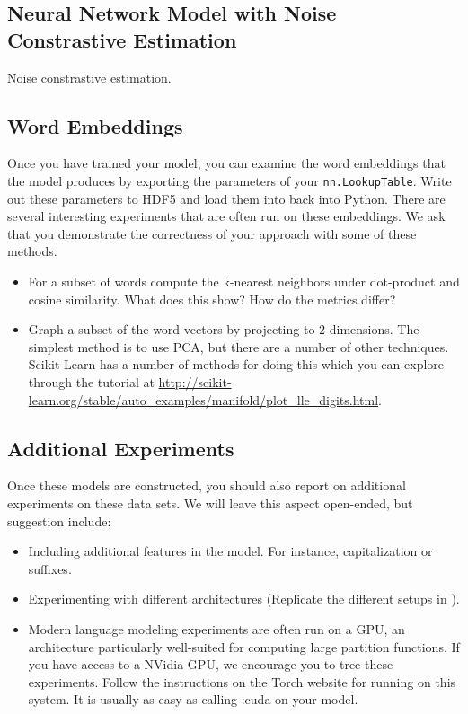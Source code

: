 \documentclass[11pt]{article}
\begin{document}
\subsection{Neural Network Model with Noise Constrastive Estimation}

Noise constrastive estimation.

\subsection{Word Embeddings}

Once you have trained your model, you can examine the word embeddings that the model 
produces by exporting the parameters of your \texttt{nn.LookupTable}. Write out these 
parameters to HDF5 and load them into back into Python. There are several interesting 
experiments that are often run on these embeddings. We ask that you demonstrate the 
correctness of your approach with some of these methods.

\begin{itemize}
\item For a subset of words compute the k-nearest neighbors under dot-product and
  cosine similarity. What does this show? How do the metrics differ?
\item Graph a subset of the word vectors by projecting to 2-dimensions.  The simplest method is to use PCA, but there are a number of other techniques. Scikit-Learn has a number of 
  methods for doing this which you can explore through the tutorial at \url{http://scikit-learn.org/stable/auto_examples/manifold/plot_lle_digits.html}.
\end{itemize}

\subsection{Additional Experiments}

Once these models are constructed, you should also report on
additional experiments on these data sets. We will leave this aspect
open-ended, but suggestion include:

\begin{itemize}
\item Including additional features in the model. For instance, capitalization or suffixes.
\item Experimenting with different architectures (Replicate the different setups in \cite{}).
\item Modern language modeling experiments are often run on a GPU, an
  architecture particularly well-suited for computing large partition
  functions. If you have access to a NVidia GPU, we encourage you to
  tree these experiments. Follow the instructions on the Torch website for running on this 
  system. It is usually as easy as calling :cuda on your model.
\end{itemize}
\end{document}
